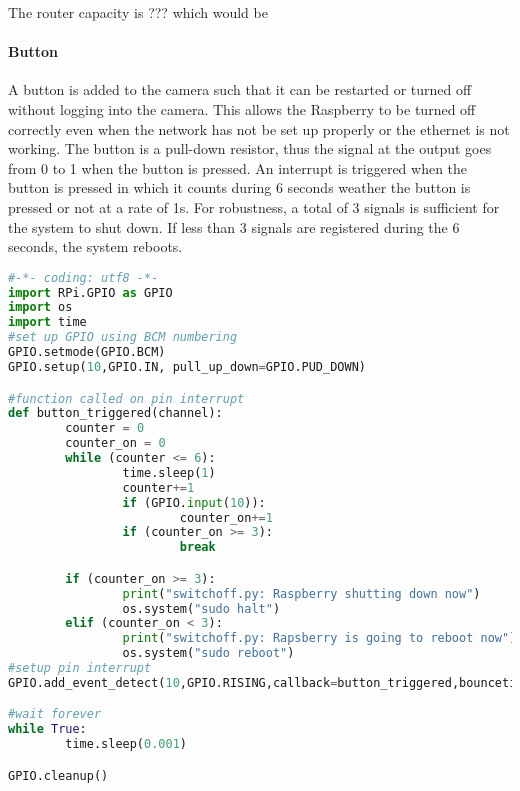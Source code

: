 The router capacity is ??? which would be 

\paragraph{Button}

A button is added to the camera such that it can be restarted or turned off without logging into the camera. This allows the Raspberry to be turned off correctly even when the network has not be set up properly or the ethernet is not working.
The button is a pull-down resistor, thus the signal at the output goes from 0 to 1 when the button is pressed. An interrupt is triggered when the button is pressed in which it counts during 6 seconds weather the button is pressed or not at a rate of 1s. For robustness, a total of 3 signals is sufficient for the system to shut down. If less than 3 signals are registered during the 6 seconds, the system reboots. 

\begin{center}
\begin{minipage}{0.9\linewidth}
\begin{lstlisting}[caption=$\sim\hspace{-0.5em}/switchoff.sh$, label=switchoff, language=Python, frame=none]
#-*- coding: utf8 -*-
import RPi.GPIO as GPIO
import os
import time
#set up GPIO using BCM numbering
GPIO.setmode(GPIO.BCM)
GPIO.setup(10,GPIO.IN, pull_up_down=GPIO.PUD_DOWN)

#function called on pin interrupt
def button_triggered(channel):
        counter = 0
        counter_on = 0
        while (counter <= 6):
                time.sleep(1)
                counter+=1
                if (GPIO.input(10)):
                        counter_on+=1
                if (counter_on >= 3):
                        break

        if (counter_on >= 3):
                print("switchoff.py: Raspberry shutting down now")
                os.system("sudo halt")
        elif (counter_on < 3):
                print("switchoff.py: Rapsberry is going to reboot now")
                os.system("sudo reboot")
#setup pin interrupt
GPIO.add_event_detect(10,GPIO.RISING,callback=button_triggered,bouncetime=300)

#wait forever
while True:
        time.sleep(0.001)

GPIO.cleanup()
\end{lstlisting}
\end{minipage}
\end{center}

